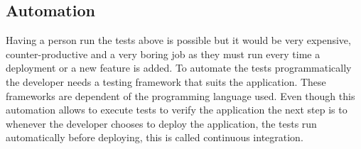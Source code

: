 \subsection{Automation}\label{sec:chap3_auto}

Having a person run the tests above is possible but it would be very expensive, counter-productive and a very boring job as they must run every time a deployment or a new feature is added. To automate the tests programmatically the developer needs a testing framework that suits the application. These frameworks are dependent of the programming language used. Even though this automation allows to execute tests to verify the application the next step is to whenever the developer chooses to deploy the application, the tests run automatically before deploying, this is called continuous integration.